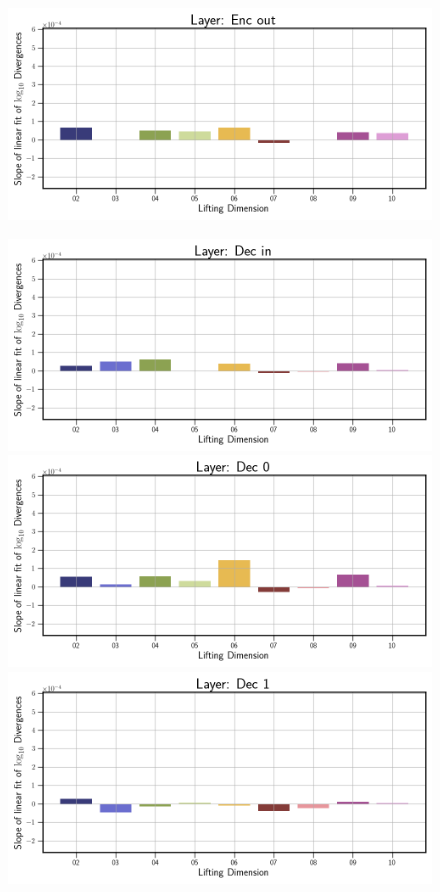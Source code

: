 \begin{figure}[!htbp]
\begin{minipage}{.5\textwidth}
        \includegraphics[width=\textwidth]{"../Figures/duffing_slope_linear_fit_enc_out.png"} 
    \end{minipage}%
    \begin{minipage}{.5\textwidth}
        \includegraphics[width=\textwidth]{"../Figures/duffing_slope_linear_fit_dec_in.png"} 
        \includegraphics[width=\textwidth]{"../Figures/duffing_slope_linear_fit_dec_0.png"} 
        \includegraphics[width=\textwidth]{"../Figures/duffing_slope_linear_fit_dec_1.png"} 

\end{minipage}
\end{figure}
